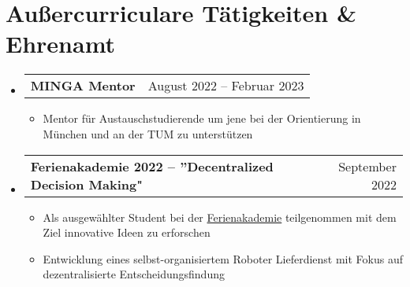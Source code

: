 \documentclass[letterpaper,11pt]{article}
\makeatletter
\newcommand{\resumeItem}[1]{
  \item\small{
    {#1 \vspace{-2pt}}
  }
}
\newcommand{\resumeProjectHeading}[2]{
    \item
    \begin{tabular*}{0.97\textwidth}{l@{\extracolsep{\fill}}r}
      \small#1 & #2 \\
    \end{tabular*}\vspace{-7pt}
}
\newcommand{\resumeSubHeadingListStart}{\begin{itemize}[leftmargin=0.15in, label={}]}
\newcommand{\resumeSubHeadingListEnd}{\end{itemize}}
\newcommand{\resumeItemListStart}{\begin{itemize}}
\newcommand{\resumeItemListEnd}{\end{itemize}\vspace{-5pt}}
\makeatother
\begin{document}


\section{Außercurriculare Tätigkeiten \& Ehrenamt}
\resumeSubHeadingListStart
\resumeProjectHeading
    {\textbf{MINGA Mentor} }{August 2022 -- Februar 2023}
    \resumeItemListStart
      \resumeItem{Mentor für Austauschstudierende um jene bei der Orientierung in München und an der TUM zu unterstützen}
    \resumeItemListEnd
\resumeProjectHeading
  {\textbf{Ferienakademie 2022 -- ”Decentralized Decision Making"}}{September 2022}
  \resumeItemListStart
    \resumeItem{Als ausgewählter Student bei der \href{https://ase.in.tum.de/lehrstuhl_1/projects/1193-ferienakademie-2022}{Ferienakademie} teilgenommen mit dem Ziel innovative Ideen zu erforschen}
    \resumeItem{Entwicklung eines selbst-organisiertem Roboter Lieferdienst mit Fokus auf dezentralisierte Entscheidungsfindung}
  \resumeItemListEnd
\resumeSubHeadingListEnd


\end{document}
